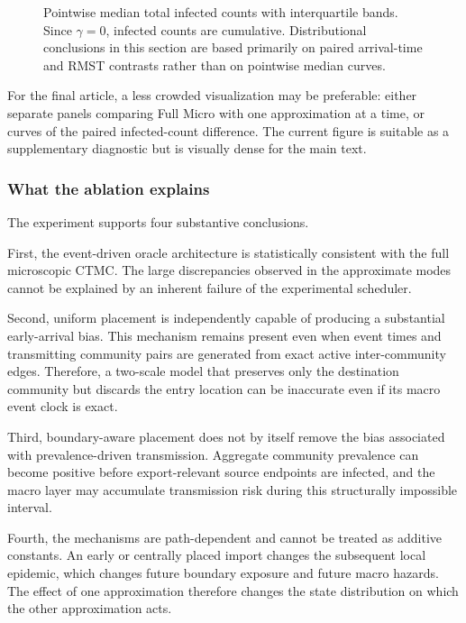 \begin{figure}[t]
    \centering
    \caption{Pointwise median total infected counts with interquartile bands.  Since $\gamma=0$, infected counts are cumulative.  Distributional conclusions in this section are based primarily on paired arrival-time and RMST contrasts rather than on pointwise median curves.}
    \label{fig:hazard_placement_infected_dynamics}
\end{figure}

For the final article, a less crowded visualization may be preferable: either separate panels comparing Full Micro with one approximation at a time, or curves of the paired infected-count difference.  The current figure is suitable as a supplementary diagnostic but is visually dense for the main text.

\subsubsection{What the ablation explains}
\label{sec:hazard_placement_explained}

The experiment supports four substantive conclusions.

First, the event-driven oracle architecture is statistically consistent with the full microscopic CTMC.  The large discrepancies observed in the approximate modes cannot be explained by an inherent failure of the experimental scheduler.

Second, uniform placement is independently capable of producing a substantial early-arrival bias.  This mechanism remains present even when event times and transmitting community pairs are generated from exact active inter-community edges.  Therefore, a two-scale model that preserves only the destination community but discards the entry location can be inaccurate even if its macro event clock is exact.

Third, boundary-aware placement does not by itself remove the bias associated with prevalence-driven transmission.  Aggregate community prevalence can become positive before export-relevant source endpoints are infected, and the macro layer may accumulate transmission risk during this structurally impossible interval.

Fourth, the mechanisms are path-dependent and cannot be treated as additive constants.  An early or centrally placed import changes the subsequent local epidemic, which changes future boundary exposure and future macro hazards.  The effect of one approximation therefore changes the state distribution on which the other approximation acts.

